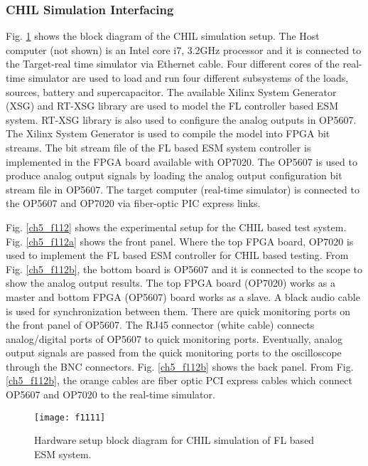 \subsubsection{CHIL Simulation Interfacing}
Fig. \ref{ch5_f111} shows the block diagram of the CHIL simulation setup. The Host computer (not shown) is an Intel core i7, 3.2GHz processor and it is connected to the Target-real time simulator via Ethernet cable. Four different cores of the real-time simulator are used to load and run four different subsystems of the loads, sources, battery and supercapacitor. The available Xilinx System Generator (XSG) and RT-XSG library are used to model the FL controller based ESM system. RT-XSG library is also used to configure the analog outputs in OP5607. The Xilinx System Generator is used to compile the model into FPGA bit streams. The bit stream file of the FL based ESM system controller is implemented in the FPGA board available with OP7020. The OP5607 is used to produce analog output signals by loading the analog output configuration bit stream file in OP5607. The target computer (real-time simulator) is connected to the OP5607 and OP7020 via fiber-optic PIC express links. 


Fig. \ref{ch5_f112} shows the experimental setup for the CHIL based test system. Fig. \ref{ch5_f112a} shows the front panel. Where the top FPGA board, OP7020 is used to implement the FL based ESM controller for CHIL based testing. From Fig. \ref{ch5_f112b}, the bottom board is OP5607 and it is connected to the scope to show the analog output results. The top FPGA board (OP7020) works as a master and bottom FPGA (OP5607) board works as a slave. A black audio cable is used for synchronization between them. There are quick monitoring ports on the front panel of OP5607. The RJ45 connector (white cable) connects analog/digital ports of OP5607 to quick monitoring ports. Eventually, analog output signals are passed from the quick monitoring ports to the oscilloscope through the BNC connectors.  Fig. \ref{ch5_f112b} shows the back panel. From Fig. \ref{ch5_f112b}, the orange cables are fiber optic PCI express cables which connect OP5607 and OP7020 to the real-time simulator.

\begin{figure}[h!]
\centering

\texttt{[image: f1111]}
\caption{Hardware setup block diagram for CHIL simulation of FL based ESM system.}
\label{ch5_f111}
\end{figure}

